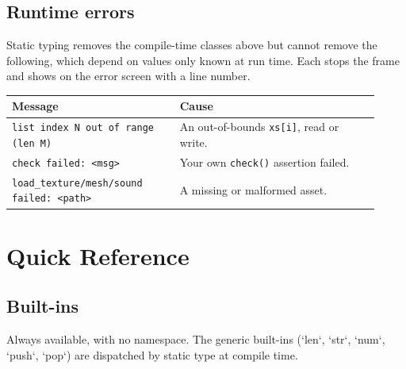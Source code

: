 \section*{Runtime errors}

Static typing removes the compile-time classes above but cannot remove the
following, which depend on values only known at run time. Each stops the frame
and shows on the error screen with a line number.

\begin{center}
\begin{tabular}{@{}p{0.42\linewidth}p{0.50\linewidth}@{}}
\toprule
\textbf{Message} & \textbf{Cause} \\
\midrule
\texttt{list index N out of range (len M)} &
An out-of-bounds \texttt{xs[i]}, read or write. \\
\texttt{check failed: <msg>} &
Your own \texttt{check()} assertion failed. \\
\texttt{load\_texture/mesh/sound failed: <path>} &
A missing or malformed asset. \\
\bottomrule
\end{tabular}
\end{center}

\chapter{Quick Reference}

\section*{Built-ins}

Always available, with no namespace. The generic built-ins (`len`, `str`,
`num`, `push`, `pop`) are dispatched by static type at compile time.

